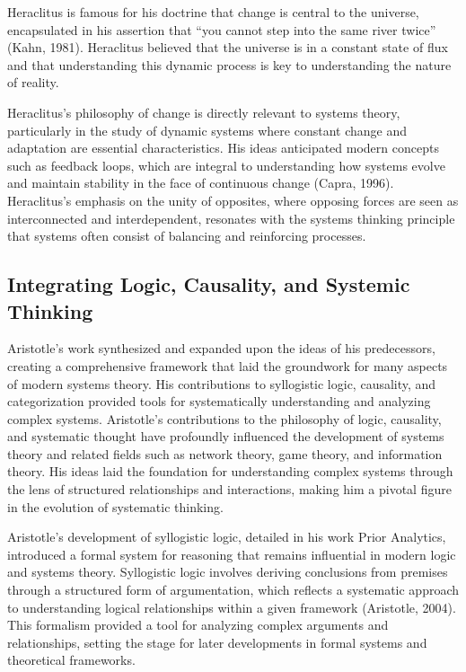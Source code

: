 \documentclass[twocolumn]{article}
\begin{document}
\textcolor{primary}{Heraclitus is famous for his doctrine that change is central to the universe, encapsulated in his assertion that “you cannot step into the same river twice” (Kahn, 1981). Heraclitus believed that the universe is in a constant state of flux and that understanding this dynamic process is key to understanding the nature of reality.}

\textcolor{secondary}{Heraclitus’s philosophy of change is directly relevant to systems theory, particularly in the study of dynamic systems where constant change and adaptation are essential characteristics. His ideas anticipated modern concepts such as feedback loops, which are integral to understanding how systems evolve and maintain stability in the face of continuous change (Capra, 1996). Heraclitus’s emphasis on the unity of opposites, where opposing forces are seen as interconnected and interdependent, resonates with the systems thinking principle that systems often consist of balancing and reinforcing processes.}

\subsection{Integrating Logic, Causality, and Systemic Thinking}

\textcolor{primary}{Aristotle's work synthesized and expanded upon the ideas of his predecessors, creating a comprehensive framework that laid the groundwork for many aspects of modern systems theory. His contributions to syllogistic logic, causality, and categorization provided tools for systematically understanding and analyzing complex systems. Aristotle's contributions to the philosophy of logic, causality, and systematic thought have profoundly influenced the development of systems theory and related fields such as network theory, game theory, and information theory. His ideas laid the foundation for understanding complex systems through the lens of structured relationships and interactions, making him a pivotal figure in the evolution of systematic thinking.}

\textcolor{secondary}{Aristotle's development of syllogistic logic, detailed in his work Prior Analytics, introduced a formal system for reasoning that remains influential in modern logic and systems theory. Syllogistic logic involves deriving conclusions from premises through a structured form of argumentation, which reflects a systematic approach to understanding logical relationships within a given framework (Aristotle, 2004). This formalism provided a tool for analyzing complex arguments and relationships, setting the stage for later developments in formal systems and theoretical frameworks.}
\end{document}
